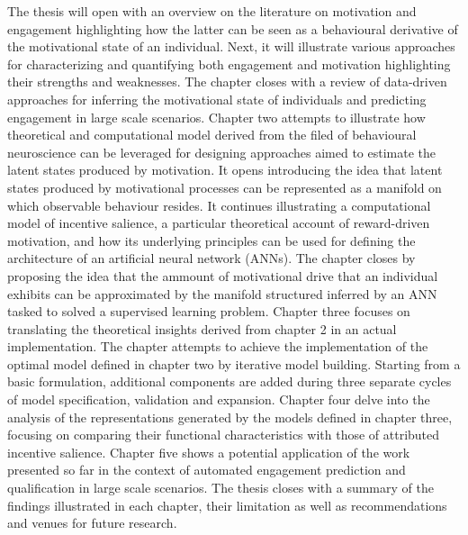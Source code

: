 The thesis will open with an overview on the literature on motivation and engagement highlighting how the latter can be seen as a behavioural derivative of the motivational state of an individual. Next, it will illustrate various approaches for characterizing and quantifying both engagement and motivation highlighting their strengths and weaknesses. The chapter closes with a review of data-driven approaches for inferring the motivational state of individuals and predicting engagement in large scale scenarios. Chapter two attempts to illustrate how theoretical and computational model derived from the filed of behavioural neuroscience can be leveraged for designing approaches aimed to estimate the latent states produced by motivation. It opens introducing the idea that latent states produced by motivational processes can be represented as a manifold on which observable behaviour resides. It continues illustrating a computational model of incentive salience, a particular theoretical account of reward-driven motivation, and how its underlying principles can be used for defining the architecture of an artificial neural network (ANNs). The chapter closes by proposing the idea that the ammount of motivational drive that an individual exhibits can be approximated by the manifold structured inferred by an ANN tasked to solved a supervised learning problem. Chapter three focuses on translating the theoretical insights derived from chapter 2 in an actual implementation. The chapter attempts to achieve the implementation of the optimal model defined in chapter two by iterative model building. Starting from a basic formulation, additional components are added during three separate cycles of model specification, validation and expansion. Chapter four delve into the analysis of the representations generated by the models defined in chapter three, focusing on comparing their functional characteristics with those of attributed incentive salience. Chapter five shows a potential application of the work presented so far in the context of automated engagement prediction and qualification in large scale scenarios. The thesis closes with a summary of the findings illustrated in each chapter, their limitation as well as recommendations and venues for future research.


